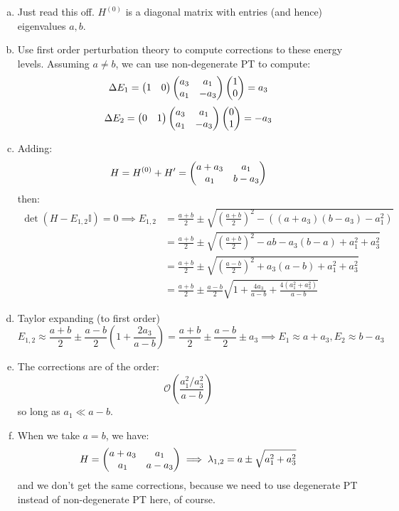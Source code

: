 \begin{enumerate}[(a)]
    \item Just read this off. $H^{(0)}$ is a diagonal matrix with entries (and hence) eigenvalues $a, b$. 
    \item Use first order perturbation theory to compute corrections to these energy levels. Assuming $a \neq b$, we can use non-degenerate PT to compute:
    \begin{equation}
        \Delta E_1 = \begin{pmatrix}1 & 0\end{pmatrix}\begin{pmatrix}a_3 & a_1 \\ a_1 & -a_3\end{pmatrix}\begin{pmatrix}1\\ 0\end{pmatrix} = a_3
    \end{equation}
    \begin{equation}
        \Delta E_2 = \begin{pmatrix}0 & 1\end{pmatrix}\begin{pmatrix}a_3 & a_1 \\ a_1 & -a_3\end{pmatrix}\begin{pmatrix}0\\ 1\end{pmatrix} = -a_3
    \end{equation}
    \item Adding:
    \begin{equation}
        H = H^{(0)} + H' = \begin{pmatrix}a + a_3 & a_1 \\ a_1 & b - a_3\end{pmatrix}
    \end{equation}
    then:
    \begin{equation}
        \begin{split}
            \det(H - E_{1,2}\mathbb{I}) = 0 \implies E_{1, 2} &= \frac{a+b}{2} \pm \sqrt{\left(\frac{a+b}{2}\right)^2 - ((a + a_3)(b - a_3) - a_1^2)}
            \\ &= \frac{a + b}{2} \pm \sqrt{\left(\frac{a+b}{2}\right)^2 - ab - a_3(b - a) + a_1^2 + a_3^2}
            \\ &= \frac{a+b}{2} \pm \sqrt{\left(\frac{a-b}{2}\right)^2 + a_3(a - b) + a_1^2 + a_3^2}
            \\ &= \frac{a+b}{2} \pm \frac{a-b}{2}\sqrt{1 + \frac{4a_3}{a-b} + \frac{4(a_1^2 + a_3^2)}{a-b}}
        \end{split}
    \end{equation}
    \item Taylor expanding (to first order)
    \begin{equation}
        E_{1, 2} \approx \frac{a + b}{2} \pm \frac{a-b}{2}\left(1 + \frac{2a_3}{a-b}\right) = \frac{a + b}{2} \pm \frac{a - b}{2} \pm a_3 \implies E_1 \approx a + a_3, E_2 \approx b - a_3
    \end{equation}
    \item The corrections are of the order:
    \begin{equation}
        \mathcal{O}(\frac{a_1^2/a_3^2}{a-b})
    \end{equation}
    so long as $a_1 \ll a - b$.
    \item When we take $a = b$, we have:
    \begin{equation}
        H = \begin{pmatrix}a + a_3 & a_1 \\ a_1 & a - a_3\end{pmatrix} \implies \lambda_{1, 2} = a \pm \sqrt{a_1^2 + a_3^2}
    \end{equation}
    and we don't get the same corrections, because we need to use degenerate PT instead of non-degenerate PT here, of course.
\end{enumerate}
